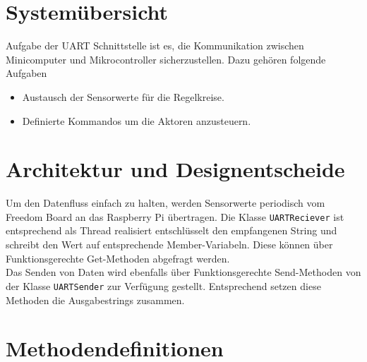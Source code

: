 \documentclass[a4paper, 10pt, fleqn]{article}
\newcommand{\code}[1]{\texttt{#1}}
\begin{document}

\tableofcontents
\clearpage
\newpage
\section{Systemübersicht}
Aufgabe der UART Schnittstelle ist es, die Kommunikation zwischen Minicomputer und Mikrocontroller sicherzustellen. Dazu gehören folgende Aufgaben
\begin{itemize}
\item Austausch der Sensorwerte für die Regelkreise.
\item Definierte Kommandos um die Aktoren anzusteuern.
\end{itemize}
\section{Architektur und Designentscheide}
Um den Datenfluss einfach zu halten, werden Sensorwerte periodisch vom Freedom Board an das Raspberry Pi übertragen. Die Klasse \code{UARTReciever} ist entsprechend als Thread realisiert entschlüsselt den empfangenen String und schreibt den Wert auf entsprechende Member-Variabeln. Diese können über Funktionsgerechte Get-Methoden abgefragt werden.\\
Das Senden von Daten wird ebenfalls über Funktionsgerechte Send-Methoden von der Klasse \code{UARTSender} zur Verfügung gestellt. Entsprechend setzen diese Methoden die Ausgabestrings zusammen.
\section{Methodendefinitionen}
\end{document}
